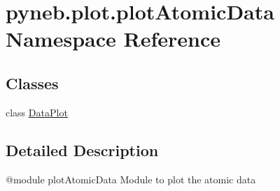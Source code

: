 \hypertarget{namespacepyneb_1_1plot_1_1plot_atomic_data}{}\section{pyneb.\+plot.\+plot\+Atomic\+Data Namespace Reference}
\label{namespacepyneb_1_1plot_1_1plot_atomic_data}
\subsection*{Classes}
\begin{DoxyCompactItemize}
\item 
class \hyperlink{classpyneb_1_1plot_1_1plot_atomic_data_1_1_data_plot}{Data\+Plot}
\end{DoxyCompactItemize}


\subsection{Detailed Description}
\begin{DoxyVerb}@module plotAtomicData
Module to plot the atomic data
\end{DoxyVerb}
 